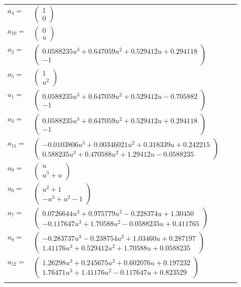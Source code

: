 \documentclass[1p]{elsarticle_modified}
\theoremstyle{definition}
\begin{document}
\begin{tabular}{m{7pt} m{180pt} m{7pt} m{180pt} }
\flushright $a_{4}=$&$\begin{pmatrix}1\\0\end{pmatrix}$ \\
\flushright $a_{10}=$&$\begin{pmatrix}0\\u\end{pmatrix}$ \\
\flushright $a_{2}=$&$\begin{pmatrix}0.0588235 u^{3}+0.647059 u^{2}+0.529412 u+0.294118\\-1\end{pmatrix}$ \\
\flushright $a_{5}=$&$\begin{pmatrix}1\\u^2\end{pmatrix}$ \\
\flushright $a_{1}=$&$\begin{pmatrix}0.0588235 u^{3}+0.647059 u^{2}+0.529412 u-0.705882\\-1\end{pmatrix}$ \\
\flushright $a_{3}=$&$\begin{pmatrix}0.0588235 u^{3}+0.647059 u^{2}+0.529412 u+0.294118\\-1\end{pmatrix}$ \\
\flushright $a_{11}=$&$\begin{pmatrix}-0.0103806 u^{3}+0.00346021 u^{2}+0.318339 u+0.242215\\0.588235 u^{3}+0.470588 u^{2}+1.29412 u-0.0588235\end{pmatrix}$ \\
\flushright $a_{9}=$&$\begin{pmatrix}u\\u^3+u\end{pmatrix}$ \\
\flushright $a_{6}=$&$\begin{pmatrix}u^2+1\\- u^3+u^2-1\end{pmatrix}$ \\
\flushright $a_{7}=$&$\begin{pmatrix}0.0726644 u^{3}+0.975779 u^{2}-0.228374 u+1.30450\\-0.117647 u^{3}+1.70588 u^{2}-0.0588235 u+0.411765\end{pmatrix}$ \\
\flushright $a_{8}=$&$\begin{pmatrix}-0.283737 u^{3}-0.238754 u^{2}+1.03460 u+0.287197\\1.41176 u^{3}+0.529412 u^{2}+1.70588 u+0.0588235\end{pmatrix}$ \\
\flushright $a_{12}=$&$\begin{pmatrix}1.26298 u^{3}+0.245675 u^{2}+0.602076 u+0.197232\\1.76471 u^{3}+1.41176 u^{2}-0.117647 u+0.823529\end{pmatrix}$\\&\end{tabular}
\end{document}
